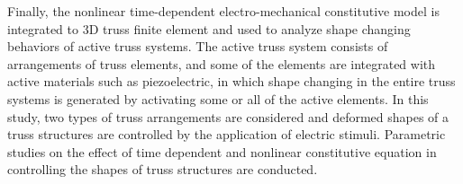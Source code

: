  
Finally, the nonlinear time-dependent electro-mechanical constitutive model is integrated to 3D truss finite element and used to analyze shape changing behaviors of active truss systems. The active truss system consists of arrangements of truss elements, and some of the elements are integrated with active materials such as piezoelectric, in which shape changing in the entire truss systems is generated by activating some or all of the active elements. In this study, two types of truss arrangements are considered and deformed shapes of a truss structures are controlled by the application of electric stimuli. Parametric studies on the effect of time dependent and nonlinear constitutive equation in controlling the shapes of truss structures are conducted. 

 

